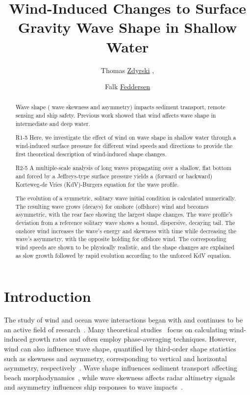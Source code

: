 \documentclass{jfm}
\title{Wind-Induced Changes to Surface Gravity Wave Shape in Shallow Water}
\author{Thomas \href{https://orcid.org/0000-0003-3039-172X}{Zdyrski}\aff{1}
  \corresp{\email{tzdyrski@uscd.edu}},
  \and Falk \href{https://orcid.org/0000-0002-5488-9074}{Feddersen}\aff{1}}
\affiliation{\aff{1}Scripps Institution of Oceanography, UCSD, La Jolla, CA 92092-0209, USA}
\begin{document}
\maketitle

\begin{abstract}
Wave shape (\eg{} wave skewness and asymmetry) impacts sediment
transport, remote sensing and ship safety.
Previous work showed that wind affects wave shape in intermediate and
deep water.
\begin{LineLabel}{R1-5}
Here, we investigate the effect of wind on wave shape in shallow water
through a wind-induced surface pressure for different wind speeds and
directions to provide the first theoretical description of wind-induced
shape changes.
\end{LineLabel}
\begin{LineLabel}{R2-5}
A multiple-scale analysis of long waves propagating over a shallow,
flat bottom and forced by a Jeffreys-type surface pressure yields a
(forward or backward) Korteweg-de Vries (KdV)-Burgers equation for the
wave profile.
\end{LineLabel}
The evolution of a symmetric, solitary wave initial condition is
calculated numerically.
The resulting wave grows (decays) for onshore (offshore) wind and
becomes asymmetric, with the rear face showing the largest shape
changes.
The wave profile's deviation from a reference solitary wave shows a
bound, dispersive, decaying tail.
The onshore wind increases the wave's energy and skewness with time
while decreasing the wave's asymmetry, with the opposite holding for
offshore wind.
The corresponding wind speeds are shown to be physically realistic, and
the shape changes are explained as slow growth followed by rapid
evolution according to the unforced KdV equation.
\end{abstract}

\section{\label{sec:introduction} Introduction}

The study of wind and ocean wave interactions began with
\citet{jeffreys1925formation} and continues to be an active field of
research~\citep[\eg][]{janssen1991quasi,donelan2006wave,sulivan2010dynamics}.
Many theoretical
studies~\citep[\eg][]{jeffreys1925formation,miles1957generation,phillips1957generation}
focus on calculating wind-induced growth rates and often employ
phase-averaging techniques.
However, wind can also influence wave shape, quantified by third-order
shape statistics such as skewness and asymmetry, corresponding to
vertical and horizontal asymmetry,
respectively~\citep[\eg][]{leykin1995asymmetry,feddersen2005wind,zdyrski2020wind}.
Wave shape influences sediment transport affecting beach
morphodynamics~\citep[\eg][]{drake2001discrete,hoefel2003wave}, while
wave skewness affects radar altimetry
signals~\citep[\eg][]{hayne1980radar} and asymmetry influences ship
responses to wave impacts~\citep[\eg][]{soares2008abnormal}.
\end{document}
